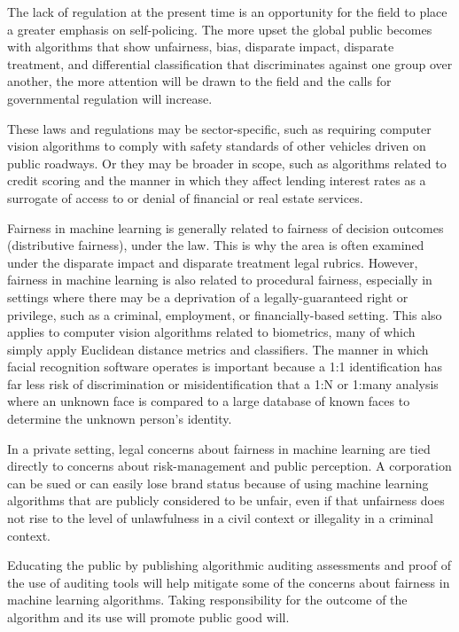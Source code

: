 \documentclass[conference]{IEEEtran}
\begin{document}
The lack of regulation at the present time is an opportunity for the field to place a greater emphasis on self-policing.  The more upset the global public becomes with algorithms that show unfairness, bias, disparate impact, disparate treatment, and differential classification that discriminates against one group over another, the more attention will be drawn to the field and the calls for governmental regulation will increase.

These laws and regulations may be sector-specific, such as requiring computer vision algorithms to comply with safety standards of other vehicles driven on public roadways. Or they may be broader in scope, such as algorithms related to credit scoring and the manner in which they affect lending interest rates as a surrogate of access to or denial of financial or real estate services.

Fairness in machine learning is generally related to fairness of decision outcomes (distributive fairness), under the law. This is why the area is often examined under the disparate impact and disparate treatment legal rubrics. However, fairness in machine learning is also related to procedural fairness, especially in settings where there may be a deprivation of a legally-guaranteed right or privilege, such as a criminal, employment, or financially-based setting. \cite{b6} This also applies to computer vision algorithms related to biometrics, many of which simply apply Euclidean distance metrics and classifiers. The manner in which facial recognition software operates is important because a 1:1 identification has far less risk of discrimination or misidentification that a 1:N or 1:many analysis where an unknown face is compared to a large database of known faces to determine the unknown person's identity.

In a private setting, legal concerns about fairness in machine learning are tied directly to concerns about risk-management and public perception. A corporation can be sued or can easily lose brand status because of using machine learning algorithms that are publicly considered to be unfair, even if that unfairness does not rise to the level of unlawfulness in a civil context or illegality in a criminal context.

Educating the public by publishing algorithmic auditing assessments and proof of the use of auditing tools will help mitigate some of the concerns about fairness in machine learning algorithms. Taking responsibility for the outcome of the algorithm and its use will promote public good will.
\end{document}
